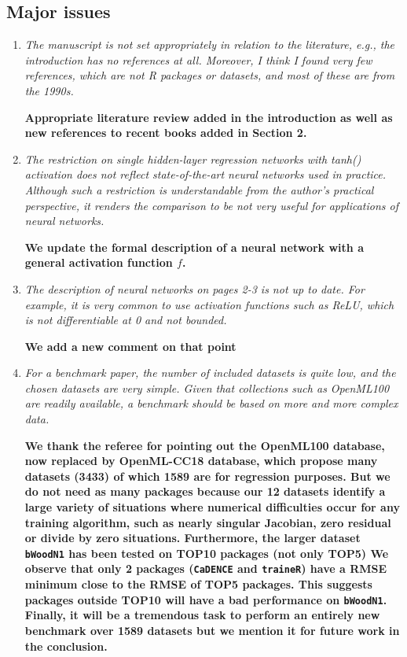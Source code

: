 \documentclass[12pt]{article}
\newcommand{\code}{\texttt}
\begin{document}
\subsection*{Major issues}

\begin{enumerate}
\item \textit{The manuscript is not set appropriately in relation to the literature, e.g., the introduction has no references at all. Moreover, I think I found very few references, which are not R packages or datasets, and most of these are from the 1990s.}

\textbf{Appropriate literature review added in the introduction as well 
as new references to recent books added in Section 2.
}


\item \textit{The restriction on single hidden-layer regression networks with tanh() activation does not reflect state-of-the-art neural networks used in practice. Although such a restriction is understandable from the author’s practical perspective, it renders the comparison to be not very useful for applications of neural networks.}

\textbf{We update the formal description of a neural network with a general activation function $f$.}

\item \textit{The description of neural networks on pages 2-3 is not up to date. For example, it is very common to use activation functions such as ReLU, which is not differentiable at 0 and not bounded.}

\textbf{We add a new comment on that point}


\item \textit{For a benchmark paper, the number of included datasets is quite low, and the chosen datasets are very simple. Given that collections such as OpenML100 are readily available, a benchmark should be based on more and more complex data.}

\textbf{We thank the referee for pointing out the OpenML100 database, now replaced by OpenML-CC18 database, 
which propose many datasets (3433) of which 1589 are for regression purposes.
But we do not need as many packages because our 12 datasets identify a large variety of situations where 
numerical difficulties occur for any training algorithm, such as nearly singular Jacobian, zero residual or divide by zero
situations.
Furthermore, the larger dataset \code{bWoodN1} has been tested on TOP10 packages (not only TOP5)
We observe that only 2 packages (\code{CaDENCE} and \code{traineR}) 
have a RMSE minimum close to the RMSE of TOP5 packages. This suggests packages outside TOP10
will have a bad performance on \code{bWoodN1}. 
Finally, it will be a tremendous task to perform an entirely new benchmark over 1589 datasets
but we mention it for future work in the conclusion.}




\end{enumerate}
\end{document}
